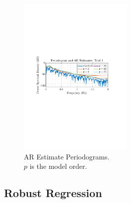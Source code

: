\documentclass[12pt]{article}
\begin{document}
\begin{figure}
\begin{centering}
		\end{centering}
		\begin{centering}
			\includegraphics[trim={2.2cm 11.2cm 3.15cm  11.2cm}, clip, width=0.49\textwidth]{../MATLAB/figures/q1_5c_fig03.pdf} 
		\end{centering}
		\captionsetup{justification=centering}
		\caption{AR Estimate Periodograms. \\ $p$ is the model order.}
	\end{figure}
	
	\pagebreak
	
	\subsection{Robust Regression} \label{sec: 1-6-robust-regression}
 
\end{document}
